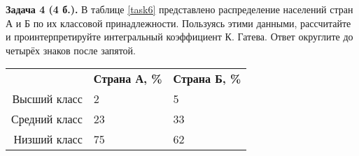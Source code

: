 \documentclass{article}
\begin{document}
\textbf{Задача 4 (4 б.).} В таблице \ref{task6} представлено распределение населений стран А и Б по их классовой принадлежности. Пользуясь этими данными, рассчитайте и проинтерпретируйте интегральный коэффициент К. Гатева. Ответ округлите до четырёх знаков после запятой.\\

\begin{minipage}{\textwidth}
\centering
\begin{tabularx}{0.7\textwidth}{rYY}
\toprule
 & \textbf{Страна А, \%} & \textbf{Страна Б, \%} \\
\cmidrule(lr){2-2}\cmidrule(lr){3-3}
Высший класс & 2 & 5 \\

Средний класс & 23 & 33 \\

Низший класс & 75 & 62 \\
\bottomrule
\end{tabularx}
\label{task6}
\end{minipage} \\[35pt]
\end{document}
